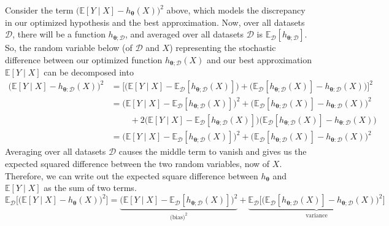 \documentclass{article}
\theoremstyle{definition}
\theoremstyle{remark}
\theoremstyle{definition}
\begin{document}
Consider the term $\big(\mathbb{E}[Y \mid X] - h_{\boldsymbol{\theta}}(X) \big)^2$ above, which models the discrepancy in our optimized hypothesis and the best approximation. Now, over all datasets $\mathcal{D}$, there will be a function $h_{{\boldsymbol{\theta}}; \mathcal{D}}$, and averaged over all datasets $\mathcal{D}$ is $\mathbb{E}_\mathcal{D} [ h_{{\boldsymbol{\theta}}; \mathcal{D}}]$. So, the random variable below (of $\mathcal{D}$ and $X$) representing the stochastic difference between our optimized function $h_{{\boldsymbol{\theta}}; \mathcal{D}} (X)$ and our best approximation $\mathbb{E}[Y\mid X]$ can be decomposed into 
\begin{align*}
    \big(\mathbb{E}[Y \mid X] - h_{{\boldsymbol{\theta}}:\mathcal{D}} (X) \big)^2 & =  \big[ \big( \mathbb{E}[Y \mid X] - \mathbb{E}_\mathcal{D} [h_{{\boldsymbol{\theta}}; \mathcal{D}} (X)] \big) + \big( \mathbb{E}_\mathcal{D} [h_{{\boldsymbol{\theta}}; \mathcal{D}} (X)] - h_{{\boldsymbol{\theta}}:\mathcal{D}} (X) \big) \big]^2 \\
    & = \big( \mathbb{E}[Y \mid X] - \mathbb{E}_\mathcal{D} [h_{{\boldsymbol{\theta}}; \mathcal{D}} (X)] \big)^2 + \big( \mathbb{E}_\mathcal{D} [h_{{\boldsymbol{\theta}}; \mathcal{D}} (X)] - h_{{\boldsymbol{\theta}}:\mathcal{D}} (X) \big)^2 \\
    & \;\;\;\;\;\;\;\; + 2 \big( \mathbb{E}[Y \mid X] - \mathbb{E}_\mathcal{D} [h_{{\boldsymbol{\theta}}; \mathcal{D}} (X)] \big) \big( \mathbb{E}_\mathcal{D} [h_{{\boldsymbol{\theta}}; \mathcal{D}} (X)] - h_{{\boldsymbol{\theta}}:\mathcal{D}} (X) \big) \\
    & = \big( \mathbb{E}[Y \mid X] - \mathbb{E}_\mathcal{D} [h_{{\boldsymbol{\theta}}; \mathcal{D}} (X)] \big)^2 + \big( \mathbb{E}_\mathcal{D} [h_{{\boldsymbol{\theta}}; \mathcal{D}} (X)] - h_{{\boldsymbol{\theta}}:\mathcal{D}} (X) \big)^2 
\end{align*}
Averaging over all datasets $\mathcal{D}$ causes the middle term to vanish and gives us the expected squared difference between the two random variables, now of $X$. Therefore, we can write out the expected square difference between $h_{\boldsymbol{\theta}}$ and $\mathbb{E}[Y\mid X]$ as the sum of two terms. 
\[\mathbb{E}_\mathcal{D} \big[ \big(\mathbb{E}[Y \mid X] - h_{\boldsymbol{\theta}}(X) \big)^2 \big] = \underbrace{\big( \mathbb{E}[Y \mid X] - \mathbb{E}_\mathcal{D} [h_{{\boldsymbol{\theta}}; \mathcal{D}} (X)] \big)^2}_{\text{(bias)}^2} + \underbrace{ \mathbb{E}_\mathcal{D} \big[ \big( \mathbb{E}_\mathcal{D} [h_{{\boldsymbol{\theta}}; \mathcal{D}} (X)] - h_{\boldsymbol{\theta}; \mathcal{D}}(X) \big)^2 \big]}_{\text{variance}}\]
\end{document}
